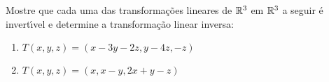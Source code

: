 \documentclass[12pt]{exam}
\begin{document}


\begin{exercicio}
	Mostre que cada uma das transforma\c{c}\~oes lineares de $\mathbb{R}^3$ em $\mathbb{R}^3$ a seguir \'e invert{\'\i}vel e determine a transforma\c{c}\~ao linear inversa:
	\begin{enumerate}[label=({\alph*})]
		\item $T(x,y,z) = (x - 3y - 2z, y - 4z, -z)$
		\item $T(x,y,z) = (x, x - y, 2x + y -z)$
	\end{enumerate}
\end{exercicio}
\end{document}
